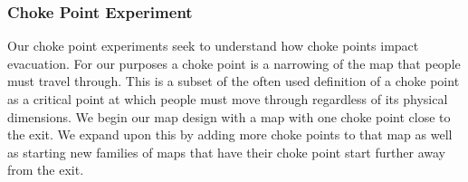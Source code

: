 \documentclass[12pt,letterpaper]{article}
\begin{document}
\subsubsection{Choke Point Experiment} \label{chokepoint}

Our choke point experiments seek to understand how choke points impact evacuation.  For our purposes a choke point is a narrowing of the map that people must travel through.  This is a subset of the often used definition of a choke point as a critical point at which people must move through\cite{evacOptions} regardless of its physical dimensions.  We begin our map design with a map with one choke point close to the exit.  We expand upon this by adding more choke points to that map as well as starting new families of maps that have their choke point start further away from the exit.
\end{document}
